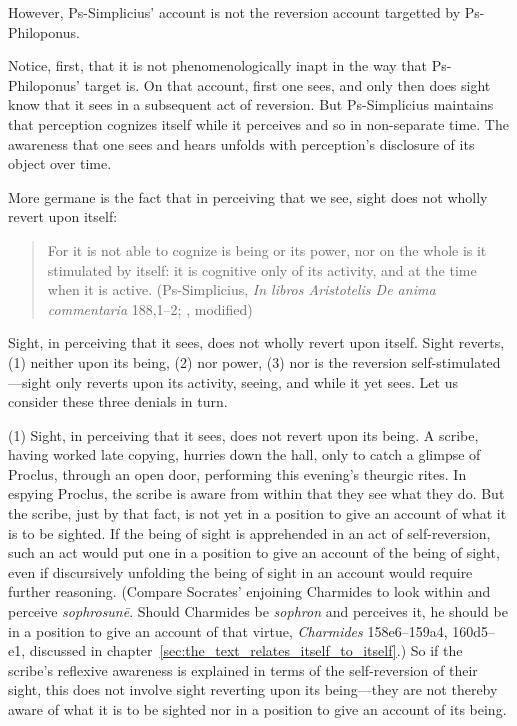 However, Ps-Simplicius' account is not the reversion account targetted by Ps-Philoponus. 

Notice, first, that it is not phenomenologically inapt in the way that Ps-Phi\-lo\-po\-nus' target is. On that account, first one sees, and only then does sight know that it sees in a subsequent act of reversion. But Ps-Simplicius maintains that perception cognizes itself while it perceives and so in non-separate time. The awareness that one sees and hears unfolds with perception's disclosure of its object over time.

More germane is the fact that in perceiving that we see, sight does not wholly revert upon itself:
\begin{quote}
	For it is not able to cognize is being or its power, nor on the whole is it stimulated by itself: it is cognitive only of its activity, and at the time when it is active. (Ps-Simplicius, \emph{In libros Aristotelis De anima commentaria} 188,1–2; \citealt[40]{Blumenthal:2000rf}, modified)
\end{quote}
Sight, in perceiving that it sees, does not wholly revert upon itself. Sight reverts, (1) neither upon its being, (2) nor power, (3) nor is the reversion self-stimulated—sight only reverts upon its activity, seeing, and while it yet sees. Let us consider these three denials in turn.

(1) Sight, in perceiving that it sees, does not revert upon its being. A scribe, having worked late copying, hurries down the hall, only to catch a glimpse of Proclus, through an open door, performing this evening's theurgic rites. In espying Proclus, the scribe is aware from within that they see what they do. But the scribe, just by that fact, is not yet in a position to give an account of what it is to be sighted. If the being of sight is apprehended in an act of self-reversion, such an act would put one in a position to give an account of the being of sight, even if discursively unfolding the being of sight in an account would require further reasoning. (Compare Socrates' enjoining Charmides to look within and perceive \emph{sophrosunē}. Should Charmides be \emph{sophron} and perceives it, he should be in a position to give an account of that virtue, \emph{Charmides} 158e6–159a4, 160d5–e1, discussed in chapter~\ref{sec:the_text_relates_itself_to_itself}.) So if the scribe's reflexive awareness is explained in terms of the self-reversion of their sight, this does not involve sight reverting upon its being—they are not thereby aware of what it is to be sighted nor in a position to give an account of its being. 


